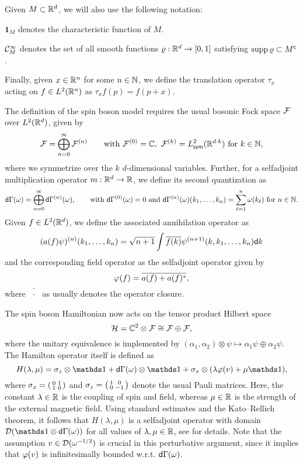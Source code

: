 \documentclass[a4paper,12pt,oneside]{article}
\newcommand{\chr}[1]{\mathbf{1}_{#1}}
\begin{document}
Given $M\subset {\mathbb R}^d$, we will also use the following notation:
\begin{description}
	\item{$\chr M$ } denotes the characteristic function of $M$.
	\item{${\mathcal C}^\infty_M$ } denotes the set of all smooth functions $\varrho:{\mathbb R}^d\to[0,1]$ satisfying $\operatorname{supp} \varrho \subset M^{\mathsf c}$.
\end{description}
Finally, given $x\in{\mathbb R}^n$ for some $n\in{\mathbb N}$, we define the translation operator $\tau_x$ acting on $f\in L^2 ({\mathbb R}^n)$ as $\tau_x f(p)=f(p+x)$.

The definition of the spin boson model requires the usual bosonic Fock space ${\mathcal F}$ over $L^2({\mathbb R}^d)$, given by
\[ {\mathcal F} = \bigoplus_{n=0}^\infty{\mathcal F}^{(n)} \qquad \mbox{with}\ {\mathcal F}^{(0)}={\mathbb C},\ {\mathcal F}^{(k)}=L^2_{{\mathsf s}{\mathsf y}{\mathsf m}}({\mathbb R}^{d\cdot k})\ \mbox{for}\ k\in{\mathbb N},  \]
where we symmetrize over the $k$ $d$-dimensional variables.
Further, for a selfadjoint multiplication operator $m:{\mathbb R}^d\to{\mathbb R}$, we define its second quantization as
\[ \dG(\omega) = \bigoplus_{n=0}^\infty \dG^{(n)}(\omega), \qquad\mbox{with}\ \dG^{(0)}(\omega)=0\ \mbox{and}\ \dG^{(n)}(\omega)(k_1,\ldots,k_n) = {\sum_{\ell=1}^{n}\omega(k_\ell)}\ \mbox{for}\ n\in\IN.  \]
Given $f\in L^2({\mathbb R}^d)$, we define the associated annihilation operator as
\[ (a(f)\psi)^{(n)}(k_1,\ldots,k_n) = \sqrt{n+1}\int \overline{f(k)}\psi^{(n+1)}(k,k_1,\ldots,k_n){\mathsf d} k \]
and the corresponding field operator as the selfadjoint operator given by
\[ \varphi(f)  = \overline{a(f)+a(f)^*},\]
where $\bar{\phantom{(} \cdot\phantom{)} }$ as usually denotes the operator closure.

The spin boson Hamiltonian now acts on the tensor product Hilbert space
\begin{equation}\label{def:HS}
	{\mathcal H} = {\mathbb C}^2 \otimes {\mathcal F} \cong {\mathcal F}\oplus {\mathcal F},
\end{equation}
where the unitary equivalence is implemented by $(\alpha_1,\alpha_2)\otimes \psi \mapsto \alpha_1\psi \oplus \alpha_2 \psi$.
The Hamilton operator itself is defined as
\begin{equation}\label{def:SB}
	H(\lambda,\mu) = \sigma_z\otimes \Id + \dG(\omega) \otimes \Id + \sigma_x \otimes (\lambda \ph(v) + \mu \Id),
\end{equation}
where $\sigma_x=\begin{psmallmatrix}0&1\\1&0\end{psmallmatrix}$ and $\sigma_z=\begin{psmallmatrix}1&0\\0&-1\end{psmallmatrix}$ denote the usual Pauli matrices. Here, the constant $\lambda\in{\mathbb R}$ is the coupling of spin and field, whereas $\mu\in{\mathbb R}$ is the strength of the external magnetic field. Using standard estimates and the Kato--Rellich theorem, it follows that $H(\lambda,\mu)$ is a selfadjoint operator with domain $\cD(\Id\otimes\dG(\omega))$ for all values of $\lambda,\mu\in{\mathbb R}$, see \cite[Lemma 2.2]{HaslerHinrichsSiebert.2021a} for details. Note that the assumption $v\in {\mathcal D}(\omega^{-1/2})$ is crucial in this perturbative argument, since it implies that $\varphi(v)$ is infinitesimally bounded w.r.t. ${\mathsf d}\Gamma(\omega)$.
\end{document}
